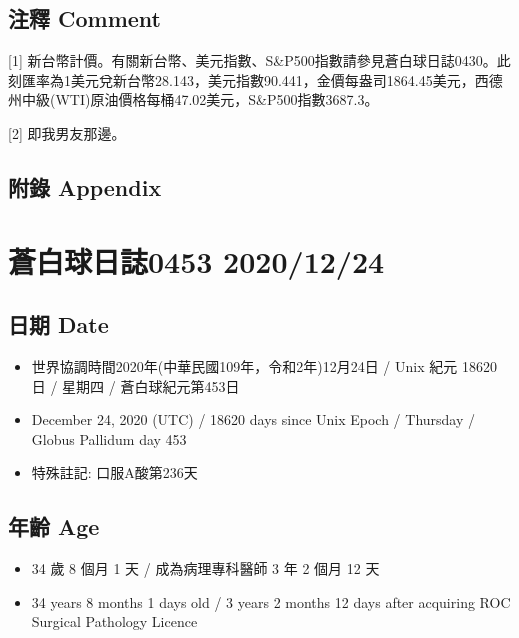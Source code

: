 \documentclass[a5paper, 10pt
]{book}
\providecommand{\tightlist}{%
  \setlength{\itemsep}{0pt}\setlength{\parskip}{0pt}}
\begin{document}
\hypertarget{ux6ce8ux91cb-comment-22}{%
\subsection{注釋 Comment}\label{ux6ce8ux91cb-comment-22}}

{[}1{]}
新台幣計價。有關新台幣、美元指數、S\&P500指數請參見蒼白球日誌0430。此刻匯率為1美元兌新台幣28.143，美元指數90.441，金價每盎司1864.45美元，西德州中級(WTI)原油價格每桶47.02美元，S\&P500指數3687.3。

{[}2{]} 即我男友那邊。

\hypertarget{ux9644ux9304-appendix-22}{%
\subsection{附錄 Appendix}\label{ux9644ux9304-appendix-22}}

\hypertarget{ux84bcux767dux7403ux65e5ux8a8c0453-20201224}{%
\section{蒼白球日誌0453
2020/12/24}\label{ux84bcux767dux7403ux65e5ux8a8c0453-20201224}}

\hypertarget{ux65e5ux671f-date-23}{%
\subsection{日期 Date}\label{ux65e5ux671f-date-23}}

\begin{itemize}
\tightlist
\item
  世界協調時間2020年(中華民國109年，令和2年)12月24日 / Unix 紀元 18620
  日 / 星期四 / 蒼白球紀元第453日
\item
  December 24, 2020 (UTC) / 18620 days since Unix Epoch / Thursday /
  Globus Pallidum day 453
\item
  特殊註記: 口服A酸第236天
\end{itemize}

\hypertarget{ux5e74ux9f61-age-23}{%
\subsection{年齡 Age}\label{ux5e74ux9f61-age-23}}

\begin{itemize}
\tightlist
\item
  34 歲 8 個月 1 天 / 成為病理專科醫師 3 年 2 個月 12 天
\item
  34 years 8 months 1 days old / 3 years 2 months 12 days after
  acquiring ROC Surgical Pathology Licence
\end{itemize}
\end{document}

